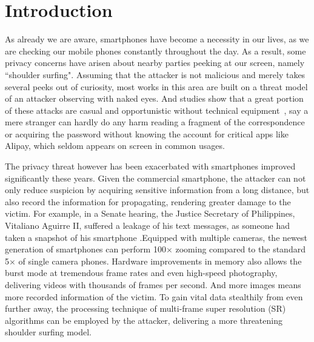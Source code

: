 \section{Introduction}
\label{sec-introduction}

As already we are aware, smartphones have become a necessity in our lives, as we are checking our mobile phones constantly throughout the day. As a result, some privacy concerns have arisen about nearby parties peeking at our screen, namely ``shoulder surfing". 
Assuming that the attacker is not malicious and merely takes several peeks out of curiosity, most works in this area are built on a threat model of an attacker observing with naked eyes. And studies show that a great portion of these attacks are casual and opportunistic without technical equipment~\cite{eiband2017understanding}, say a mere stranger can hardly do any harm reading a fragment of the correspondence or acquiring the password without knowing the account for critical apps like Alipay, which seldom appears on screen in common usages. 

The privacy threat however has been exacerbated with smartphones improved significantly these years. Given the commercial smartphone, the attacker can not only reduce suspicion by acquiring sensitive information from a long distance, but also record the information for propagating, rendering greater damage to the victim. For example, in a Senate hearing, the Justice Secretary of Philippines, Vitaliano Aguirre II, suffered a leakage of his text messages, as someone had taken a snapshot of his smartphone \cite{Polotiko2017leakage}.Equipped with multiple cameras, the newest generation of smartphones can perform 100$\times$ zooming compared to the standard 5$\times$ of single camera phones. Hardware improvements in memory also allows the burst mode at tremendous frame rates and even high-speed photography, delivering videos with thousands of frames per second. And more images means more recorded information of the victim. To gain vital data stealthily from even further away, the processing technique of multi-frame super resolution (SR) algorithms can be employed by the attacker, delivering a more threatening shoulder surfing model.

